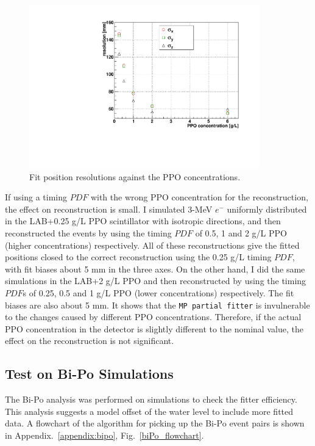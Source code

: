 \begin{figure}[!htb]
	\centering
	\includegraphics[width=10cm]{partialResolVsPPO.pdf}
	\caption{Fit position resolutions against the PPO concentrations.}
	\label{fig:partialResolVsPPO}
\end{figure}

If using a timing $PDF$ with the wrong PPO concentration for the reconstruction, the effect on reconstruction is small\cite{partialFitterPDFtestInvulnerable}. I simulated 3-MeV $e^-$ uniformly distributed in the LAB+0.25 g/L PPO scintillator with isotropic directions, and then reconstructed the events by using the timing $PDF$ of 0.5, 1 and 2 g/L PPO (higher concentrations) respectively. All of these reconstructions give the fitted positions closed to the correct reconstruction using the 0.25 g/L timing $PDF$, with fit biases about 5 mm in the three axes. On the other hand, I did the same simulations in the LAB+2 g/L PPO and then reconstructed by using the timing $PDF$s of 0.25, 0.5 and 1 g/L PPO  (lower concentrations) respectively. The fit biases are also about 5 mm. It shows that the \texttt{MP partial fitter} is invulnerable to the changes caused by different PPO concentrations. Therefore, if the actual PPO concentration in the detector is slightly different to the nominal value, the effect on the reconstruction is not significant.

\subsection{Test on Bi-Po Simulations}
The Bi-Po analysis was performed on simulations to check the fitter efficiency. This analysis suggests a model offset of the water level to include more fitted data. A flowchart of the algorithm for picking up the Bi-Po event pairs is shown in Appendix.~\ref{appendix:bipo}, Fig.~\ref{biPo_flowchart}.

